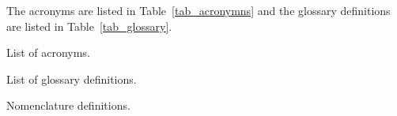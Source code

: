 \documentclass[]{../tex_resources/afitthesis}
\begin{document}
The acronyms are listed in Table~\ref{tab_acronymns} and the glossary
definitions are listed in Table~\ref{tab_glossary}.

\begin{table}[htbp!]
    \centering
    \caption{List of acronyms.}
    \printglossary[type=\acronymtype]
    \label{tab_acronymns}
\end{table}

\begin{table}[htbp!]
    \centering
    \caption{List of glossary definitions.}
    \printglossary
    \label{tab_glossary}
\end{table}



\begin{table}[htbp!]
    \centering
    \caption{Nomenclature definitions.}
    \printnomenclature
    \label{tab_nomenclature}
\end{table}



\printbibliography %


\sfTwoNineEight %
\end{document}
